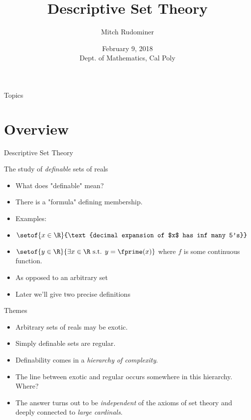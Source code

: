 \documentclass{beamer}
\title{Descriptive Set Theory}
\author{Mitch Rudominer}
\institute{Google}
\date
{February 9, 2018 \\ Dept. of Mathematics, Cal Poly }
\begin{document}
\begin{frame}
  \titlepage
\end{frame}

\begin{frame}{Topics}
  \tableofcontents
\end{frame}




\section{Overview}


\begin{frame}{Descriptive Set Theory}

The study of \emph{definable} sets of reals

\pause

  \begin{itemize}
  \item What does "definable" mean?
  \item There is a "formula" defining membership.
  \item Examples:
  \item $\setof{x\in\R}{\text{decimal expansion of $x$ has inf many 5's}}$
  \item $\setof{y\in\R}{\exists x\in\R \text{ s.t. } y=\fprime(x)}$ where $f$ is some continuous function.
  \item As opposed to an arbitrary set
  \item Later we'll give two precise definitions
  \end{itemize}


\end{frame}

\begin{frame}{Themes}

  \begin{itemize}
  \item Arbitrary sets of reals may be exotic.
  \item Simply definable sets are regular.
  \item Definability comes in a \emph{hierarchy of complexity}.
  \item The line between exotic and regular occurs somewhere in this
  hierarchy. Where?
  \item The answer turns out to be \emph{independent} of the axioms of set theory
  and deeply connected to \emph{large cardinals}.
  \end{itemize}
\end{frame}
\end{document}
